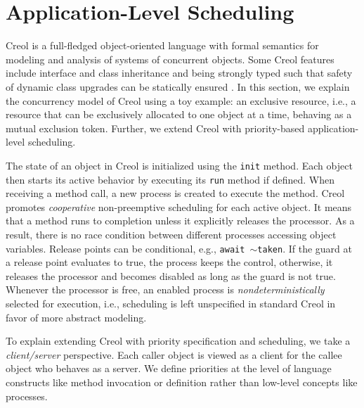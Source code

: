 %




\section{Application-Level Scheduling}
\label{sec:creol}

Creol \cite{creol:broch_owe} is a full-fledged object-oriented language with formal semantics for modeling and analysis of systems of concurrent objects. 
Some Creol features include interface and class inheritance and being strongly typed such that safety of dynamic class upgrades can be statically ensured \cite{yu06fmoods}.
In this section, we explain the concurrency model of Creol using a toy example: an exclusive resource, i.e., a
resource that can be exclusively allocated to one object at a time, behaving as a mutual exclusion token. 
Further, we extend Creol with priority-based application-level scheduling.

The state of an object in Creol is initialized using the \lstinline{init} method.
Each object then starts its active behavior by executing its
\lstinline{run} method if defined. %
When receiving a method call, a new process is created to execute the method. 
Creol promotes {\em cooperative} non-preemptive scheduling for each active object. 
It means that a method runs to completion unless it explicitly releases the processor. 
As a result, there is no race condition between different processes accessing object variables. 
Release points can be conditional, e.g.,   \lstinline{await }$\sim$\lstinline{taken}. 
If the guard at a release point evaluates to true, the
process keeps the control, otherwise, it releases the processor and becomes
disabled as long as the guard is not true. Whenever the processor is free, an
enabled process is {\em nondeterministically} selected for execution, i.e.,
scheduling is left unspecified in standard Creol in favor of more abstract modeling.


To explain extending Creol with priority specification and scheduling, we take a {\em client/server} perspective.
Each {caller} object is viewed as a client for the {callee} object who behaves as a server. 
We define priorities at the level of language constructs like method invocation or definition rather than low-level concepts like processes.


